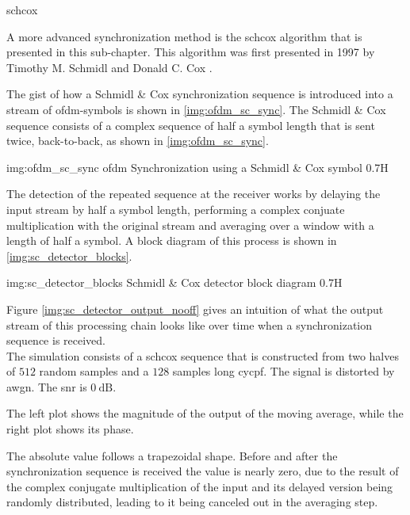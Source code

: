 \begin{subchapter}{\acrlong{schcox}}
  \label{chap:intr_scsync}

  A more advanced synchronization method is
  the \acrlong{schcox} algorithm that is presented
  in this sub-chapter.
  This algorithm was first presented in 1997 by
  Timothy M. Schmidl and Donald C. Cox \cite{schmidlcox}.

  The gist of how a Schmidl \& Cox synchronization sequence
  is introduced into a stream of \gls{ofdm}-symbols is
  shown in \autoref{img:ofdm_sc_sync}.
  The Schmidl \& Cox sequence consists of a complex sequence
  of half a symbol length that is sent twice, back-to-back,
  as shown in \autoref{img:ofdm_sc_sync}.

               {img:ofdm_sc_sync}
               {\acrshort{ofdm} Synchronization using a Schmidl \& Cox symbol}
               {0.7}{H}

  The detection of the repeated sequence at the receiver works by delaying
  the input stream by half a symbol length, performing a complex conjuate
  multiplication with the original stream and averaging over a window with
  a length of half a symbol.
  A block diagram of this process is shown in \autoref{img:sc_detector_blocks}.

               {img:sc_detector_blocks}
               {Schmidl \& Cox detector block diagram}
               {0.7}{H}

  Figure \ref{img:sc_detector_output_nooff} gives an intuition
  of what the output stream of this processing chain looks like
  over time when a synchronization sequence is received. \\

  The simulation consists of a \gls{schcox} sequence
  that is constructed from two halves of $512$ random samples
  and a $128$ samples long \acrlong{cycpf}.
  The signal is distorted by \gls{awgn}.
  The \gls{snr} is $\SI{0}{\deci\bel}$.

  The left plot shows the magnitude of the output of
  the moving average, while the right plot shows its phase.

  The absolute value follows a trapezoidal shape.
  Before and after the synchronization sequence is received
  the value is nearly zero, due to the result of the complex
  conjugate multiplication of the input and its delayed version
  being randomly distributed, leading to it being canceled out
  in the averaging step.


\end{subchapter}

